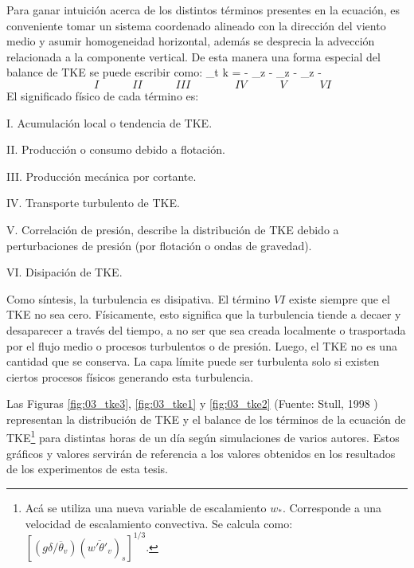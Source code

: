Para ganar intuición acerca de los distintos términos presentes en la ecuación, es conveniente tomar un sistema coordenado alineado con la dirección del viento medio y asumir homogeneidad horizontal, además se desprecia la advección relacionada a la componente vertical. De esta manera una forma especial del balance de TKE se puede escribir como:
\be
\partial_t k  =  -  \partial_z  - \partial_z -  \partial_z  - \varepsilon
\ee
\vspace{-7mm}
\begin{equation*}
\quad I \quad\qquad II\quad\qquad III\qquad\qquad IV\quad\qquad V\quad\qquad VI
\end{equation*}
El significado físico de cada término es:
\begin{enumerate*}
	\item[I.] Acumulación local o tendencia de TKE.
	\item[II.] Producción o consumo debido a flotación.
	\item[III.] Producción mecánica por cortante.
	\item[IV.] Transporte turbulento de TKE.
	\item[V.] Correlación de presión, describe la distribución de TKE debido a perturbaciones de presión (por flotación o ondas de gravedad).
	\item[VI.] Disipación de TKE.
\end{enumerate*}

Como síntesis, la turbulencia es disipativa. El término $VI$ existe siempre que el TKE no sea cero. Físicamente, esto significa que la turbulencia tiende a decaer y desaparecer a través del tiempo, a no ser que sea creada localmente o trasportada por el flujo medio o procesos turbulentos o de presión. Luego, el TKE no es una cantidad que se conserva. La capa límite puede ser turbulenta solo si existen ciertos procesos físicos generando esta turbulencia.

Las Figuras \ref{fig:03_tke3}, \ref{fig:03_tke1} y \ref{fig:03_tke2} (Fuente: Stull, 1998 \cite{stull1988introduction}) representan la distribución de TKE y el balance de los términos de la ecuación de TKE\footnote{Acá se utiliza una nueva variable de escalamiento $w_*$. Corresponde a una velocidad de escalamiento convectiva. Se calcula como: $[(g\delta/\overline{\theta}_v)(\overline{w'\theta'_v})_s]^{1/3}$.} para distintas horas de un día según simulaciones de varios autores. Estos gráficos y valores servirán de referencia a los valores obtenidos en los resultados de los experimentos de esta tesis.

